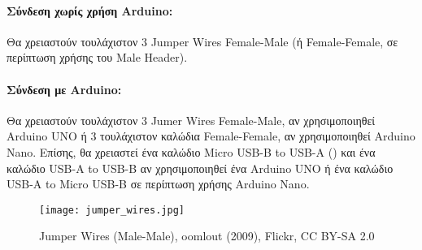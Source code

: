 		 	\paragraph{Σύνδεση χωρίς χρήση Arduino:}
		 		Θα χρειαστούν τουλάχιστον 3 Jumper Wires Female-Male (ή Female-Female, σε περίπτωση χρήσης του Male Header).
		 	\paragraph{Σύνδεση με Arduino:}
		 		\label{par:ard_conn}
		 		Θα χρειαστούν τουλάχιστον 3 Jumer Wires Female-Male, αν χρησιμοποιηθεί Arduino UNO ή 3 τουλάχιστον καλώδια Female-Female, αν χρησιμοποιηθεί Arduino Nano. Επίσης, θα χρειαστεί ένα καλώδιο Micro USB-B to USB-A () και ένα καλώδιο USB-A to USB-B αν χρησιμοποιηθεί ένα Arduino UNO ή ένα καλώδιο USB-A to Micro USB-B σε περίπτωση χρήσης Arduino Nano.

		 	\begin{figure}[h]
			\centering
				\texttt{[image: jumper\_wires.jpg]}
				\caption{Jumper Wires (Male-Male), oomlout (2009), Flickr, CC BY-SA 2.0}
			\end{figure}
